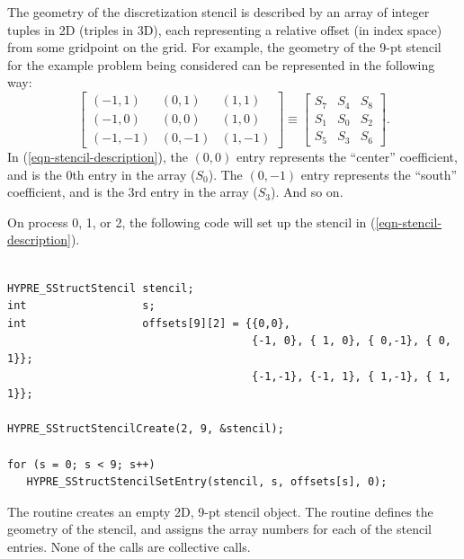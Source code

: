 The geometry of the discretization stencil is described by an array of
integer tuples in 2D (triples in 3D), each representing a relative
offset (in index space) from some gridpoint on the grid.  For example,
the geometry of the 9-pt stencil for the example problem being
considered can be represented in the following way:
\begin{equation}\label{sstruct:eqn-stencil-description}
\left [
\begin{array}{ccc}
(-1, 1) & ( 0, 1) & ( 1, 1) \\
(-1, 0) & ( 0, 0) & ( 1, 0) \\
(-1,-1) & ( 0,-1) & ( 1,-1) 
\end{array}
\right ]
\equiv
\left [
\begin{array}{ccc}
S_7 & S_4 & S_8 \\
S_1 & S_0 & S_2 \\
S_5 & S_3 & S_6
\end{array}
\right ] .
\end{equation}
In (\ref{eqn-stencil-description}), the $(0,0)$ entry represents the
``center'' coefficient, and is the 0th entry in the array ($S_0$).
The $(0,-1)$ entry represents the ``south'' coefficient, and is the
3rd entry in the array ($S_3$).  And so on.

On process 0, 1, or 2, the following code will set up the stencil in
(\ref{eqn-stencil-description}).
\begin{display}
\begin{verbatim}

HYPRE_SStructStencil stencil;
int                  s;
int                  offsets[9][2] = {{0,0},
                                      {-1, 0}, { 1, 0}, { 0,-1}, { 0, 1}};
                                      {-1,-1}, {-1, 1}, { 1,-1}, { 1, 1}};

HYPRE_SStructStencilCreate(2, 9, &stencil);

for (s = 0; s < 9; s++)
   HYPRE_SStructStencilSetEntry(stencil, s, offsets[s], 0);

\end{verbatim}
\end{display}
The  routine creates an empty 2D,
9-pt stencil object.  The 
routine defines the geometry of the stencil, and assigns the array
numbers for each of the stencil entries.  None of the calls are
collective calls.


